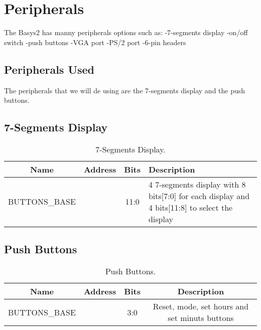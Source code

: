 \section{Peripherals}
\label{sec:periphs}

The Basys2 has manny peripherals options such as:
-7-segments display
-on/off switch
-push buttons
-VGA port
-PS/2 port
-6-pin headers

\subsection{Peripherals Used}

The peripherals that we will de using are the 7-segments display and the push buttons.


\subsection{7-Segments Display}

\begin{table}[h]
\centering
\caption{7-Segments Display.}
\sffamily
    \begin{tabular}{|c|c|c|p{10cm}|}
        \hline
        \textbf{Name} & \textbf{Address} & \textbf{Bits} & \textbf{Description} \\ [0.5ex]
        \hline
        \hline
        BUTTONS\_BASE &  & 11:0 & 4 7-segments display with 8 bits[7:0] for each display and 4 bits[11:8] to select the display \\
        \hline
    \end{tabular}
\end{table}

\subsection{Push Buttons}

\begin{table}[h]
\centering
\caption{Push Buttons.}
\sffamily
    \begin{tabular}{|c|c|c|c|}
        \hline
        \textbf{Name} & \textbf{Address} & \textbf{Bits} & \textbf{Description} \\ [0.5ex]
        \hline
        \hline
        BUTTONS\_BASE &  & 3:0 & Reset, mode, set hours and set minuts buttons\\
        \hline
    \end{tabular}
\end{table}

